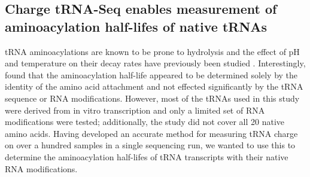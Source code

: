 \documentclass[9pt,lineno]{elife}
\begin{document}
\begin{figure}[ht!]
\label{figsupp:f5S2}
\end{figure}





\subsection{Charge tRNA-Seq enables measurement of aminoacylation half-lifes of native tRNAs}
tRNA aminoacylations are known to be prone to hydrolysis and the effect of pH and temperature on their decay rates have previously been studied \citep{Hentzen1972-yd}.
Interestingly, \cite{Peacock2014-wk} found that the aminoacylation half-life appeared to be determined solely by the identity of the amino acid attachment and not effected significantly by the tRNA sequence or RNA modifications.
However, most of the tRNAs used in this study were derived from in vitro transcription and only a limited set of RNA modifications were tested; additionally, the study did not cover all 20 native amino acids.
Having developed an accurate method for measuring tRNA charge on over a hundred samples in a single sequencing run, we wanted to use this to determine the aminoacylation half-lifes of tRNA transcripts with their native RNA modifications.
\end{document}

